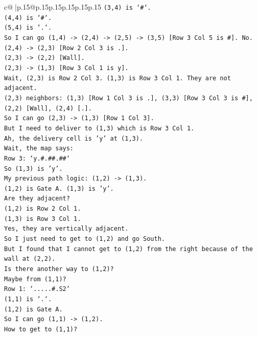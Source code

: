 \documentclass{article}
\begin{document}
{\begin{supertabular}{c@{$\;$}|p{.15\linewidth}@{}p{.15\linewidth}p{.15\linewidth}p{.15\linewidth}p{.15\linewidth}p{.15\linewidth}}
{{{\texttt{(3,4) is `\#`.} \\
\texttt{(4,4) is `\#`.} \\
\texttt{(5,4) is `.`.} \\
\texttt{So I can go (1,4) {-}> (2,4) {-}> (2,5) {-}> (3,5) {[}Row 3 Col 5 is \#{]}. No.} \\
\texttt{(2,4) {-}> (2,3) {[}Row 2 Col 3 is .{]}.} \\
\texttt{(2,3) {-}> (2,2) {[}Wall{]}.} \\
\texttt{(2,3) {-}> (1,3) {[}Row 3 Col 1 is y{]}.} \\
\texttt{Wait, (2,3) is Row 2 Col 3. (1,3) is Row 3 Col 1. They are not adjacent.} \\
\texttt{(2,3) neighbors: (1,3) {[}Row 1 Col 3 is .{]}, (3,3) {[}Row 3 Col 3 is \#{]}, (2,2) {[}Wall{]}, (2,4) {[}.{]}.} \\
\texttt{So I can go (2,3) {-}> (1,3) {[}Row 1 Col 3{]}.} \\
\texttt{But I need to deliver to (1,3) which is Row 3 Col 1.} \\
\texttt{Ah, the delivery cell is 'y' at (1,3).} \\
\texttt{Wait, the map says:} \\
\texttt{Row 3: `y.\#.\#\#.\#\#`} \\
\texttt{So (1,3) is 'y'.} \\
\texttt{My previous path logic: (1,2) {-}> (1,3).} \\
\texttt{(1,2) is Gate A. (1,3) is 'y'.} \\
\texttt{Are they adjacent?} \\
\texttt{(1,2) is Row 2 Col 1.} \\
\texttt{(1,3) is Row 3 Col 1.} \\
\texttt{Yes, they are vertically adjacent.} \\
\texttt{So I just need to get to (1,2) and go South.} \\
\texttt{But I found that I cannot get to (1,2) from the right because of the wall at (2,2).} \\
\texttt{Is there another way to (1,2)?} \\
\texttt{Maybe from (1,1)?} \\
\texttt{Row 1: `.....\#.S2`} \\
\texttt{(1,1) is `.`.} \\
\texttt{(1,2) is Gate A.} \\
\texttt{So I can go (1,1) {-}> (1,2).} \\
\texttt{How to get to (1,1)?} \\
}}}
\end{supertabular}}
\end{document}
